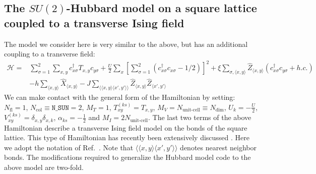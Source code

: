 




\subsection{The $SU(2)$-Hubbard model on a square lattice coupled to a transverse Ising field}\label{sec:walk2}

The model we consider here  is very similar to the  above,  but has an additional coupling to a transverse field: 
\begin{equation}
\begin{aligned}
\label{eqn_hubbard_sun_Ising}
\mathcal{H} =&
\sum\limits_{\sigma=1}^{2} 
\sum\limits_{x,y } 
  c^{\dagger}_{x \sigma} T_{x,y}c^{\phantom\dagger}_{y \sigma} 
+ \frac{U}{2}\sum\limits_{x}\left[
\sum\limits_{\sigma=1}^{2}
\left(  c^{\dagger}_{x \sigma} c^{\phantom\dagger}_{x \sigma}  -1/2 \right) \right]^{2}   
+  \xi \sum_{\sigma,\langle x,y \rangle} \hat{Z}_{\langle x,y \rangle}  \left( c^{\dagger}_{x \sigma} c^{\phantom\dagger}_{y \sigma}  + h.c. \right) \\ 
 &- h \sum_{\langle x,y \rangle} \hat{X}_{\langle x,y \rangle}   - J \sum_{\langle \langle x,y \rangle \langle x',y' \rangle \rangle} 
  \hat{Z}_{\langle x,y \rangle}   \hat{Z}_{\langle x',y' \rangle} 
  \end{aligned}
\end{equation}
We can make contact with the general form of the Hamiltonian by setting: 
$N_{\mathrm{fl}} = 1$, $N_{\mathrm{col}} \equiv \texttt{N\_SUN}     =2 $,   $M_T    =    1$,  $T^{(ks)}_{x y}   =  T_{x,y}$,  $M_V   =  N_{\text{unit-cell}} \equiv N_{\mathrm{dim}}$,  $U_{k}       =   -\frac{U}{2}$, 
 $V_{x y}^{(ks)} =  \delta_{x,y} \delta_{x,k}$,  $\alpha_{ks}   = - \frac{1}{2}  $ and $M_I       = 2 N_{\text{unit-cell}} $.  
 The last two terms of the  above Hamiltonian describe a transverse Ising field model on the bonds of the square lattice.  This  type of Hamiltonian  has  recently been extensively discussed  \cite{Schattner15,Xu16,Assaad16}.  Here we adopt the notation of Ref.~\cite{Assaad16}. Note that   $\langle \langle x,y \rangle \langle x',y' \rangle \rangle $ denotes nearest neighbor bonds.
The modifications  required to generalize the Hubbard model code to the above model are two-fold. 

